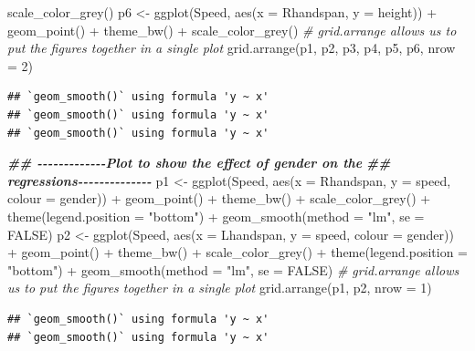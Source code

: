 \documentclass[
]{gitbook}
\newenvironment{Shaded}{\begin{snugshade}}{\end{snugshade}}
\newcommand{\AttributeTok}[1]{\textcolor[rgb]{0.77,0.63,0.00}{#1}}
\newcommand{\CommentTok}[1]{\textcolor[rgb]{0.56,0.35,0.01}{\textit{#1}}}
\newcommand{\ConstantTok}[1]{\textcolor[rgb]{0.00,0.00,0.00}{#1}}
\newcommand{\DecValTok}[1]{\textcolor[rgb]{0.00,0.00,0.81}{#1}}
\newcommand{\DocumentationTok}[1]{\textcolor[rgb]{0.56,0.35,0.01}{\textbf{\textit{#1}}}}
\newcommand{\FunctionTok}[1]{\textcolor[rgb]{0.00,0.00,0.00}{#1}}
\newcommand{\NormalTok}[1]{#1}
\newcommand{\OtherTok}[1]{\textcolor[rgb]{0.56,0.35,0.01}{#1}}
\newcommand{\SpecialCharTok}[1]{\textcolor[rgb]{0.00,0.00,0.00}{#1}}
\newcommand{\StringTok}[1]{\textcolor[rgb]{0.31,0.60,0.02}{#1}}
\begin{document}
\begin{Shaded}
\begin{Highlighting}[]
    \FunctionTok{scale\_color\_grey}\NormalTok{()}
\NormalTok{p6 }\OtherTok{\textless{}{-}} \FunctionTok{ggplot}\NormalTok{(Speed, }\FunctionTok{aes}\NormalTok{(}\AttributeTok{x =}\NormalTok{ Rhandspan, }\AttributeTok{y =}\NormalTok{ height)) }\SpecialCharTok{+} \FunctionTok{geom\_point}\NormalTok{() }\SpecialCharTok{+} \FunctionTok{theme\_bw}\NormalTok{() }\SpecialCharTok{+}
    \FunctionTok{scale\_color\_grey}\NormalTok{()}
\CommentTok{\# grid.arrange allows us to put the figures together in a single plot}
\FunctionTok{grid.arrange}\NormalTok{(p1, p2, p3, p4, p5, p6, }\AttributeTok{nrow =} \DecValTok{2}\NormalTok{)}
\end{Highlighting}
\end{Shaded}

\begin{verbatim}
## `geom_smooth()` using formula 'y ~ x'
## `geom_smooth()` using formula 'y ~ x'
## `geom_smooth()` using formula 'y ~ x'
\end{verbatim}

\begin{Shaded}
\begin{Highlighting}[]
\DocumentationTok{\#\# {-}{-}{-}{-}{-}{-}{-}{-}{-}{-}{-}{-}{-}Plot to show the effect of gender on the}
\DocumentationTok{\#\# regressions{-}{-}{-}{-}{-}{-}{-}{-}{-}{-}{-}{-}{-}{-}}
\NormalTok{p1 }\OtherTok{\textless{}{-}} \FunctionTok{ggplot}\NormalTok{(Speed, }\FunctionTok{aes}\NormalTok{(}\AttributeTok{x =}\NormalTok{ Rhandspan, }\AttributeTok{y =}\NormalTok{ speed, }\AttributeTok{colour =}\NormalTok{ gender)) }\SpecialCharTok{+} \FunctionTok{geom\_point}\NormalTok{() }\SpecialCharTok{+}
    \FunctionTok{theme\_bw}\NormalTok{() }\SpecialCharTok{+} \FunctionTok{scale\_color\_grey}\NormalTok{() }\SpecialCharTok{+} \FunctionTok{theme}\NormalTok{(}\AttributeTok{legend.position =} \StringTok{"bottom"}\NormalTok{) }\SpecialCharTok{+} \FunctionTok{geom\_smooth}\NormalTok{(}\AttributeTok{method =} \StringTok{"lm"}\NormalTok{,}
    \AttributeTok{se =} \ConstantTok{FALSE}\NormalTok{)}
\NormalTok{p2 }\OtherTok{\textless{}{-}} \FunctionTok{ggplot}\NormalTok{(Speed, }\FunctionTok{aes}\NormalTok{(}\AttributeTok{x =}\NormalTok{ Lhandspan, }\AttributeTok{y =}\NormalTok{ speed, }\AttributeTok{colour =}\NormalTok{ gender)) }\SpecialCharTok{+} \FunctionTok{geom\_point}\NormalTok{() }\SpecialCharTok{+}
    \FunctionTok{theme\_bw}\NormalTok{() }\SpecialCharTok{+} \FunctionTok{scale\_color\_grey}\NormalTok{() }\SpecialCharTok{+} \FunctionTok{theme}\NormalTok{(}\AttributeTok{legend.position =} \StringTok{"bottom"}\NormalTok{) }\SpecialCharTok{+} \FunctionTok{geom\_smooth}\NormalTok{(}\AttributeTok{method =} \StringTok{"lm"}\NormalTok{,}
    \AttributeTok{se =} \ConstantTok{FALSE}\NormalTok{)}
\CommentTok{\# grid.arrange allows us to put the figures together in a single plot}
\FunctionTok{grid.arrange}\NormalTok{(p1, p2, }\AttributeTok{nrow =} \DecValTok{1}\NormalTok{)}
\end{Highlighting}
\end{Shaded}

\begin{verbatim}
## `geom_smooth()` using formula 'y ~ x'
## `geom_smooth()` using formula 'y ~ x'
\end{verbatim}
\end{document}
